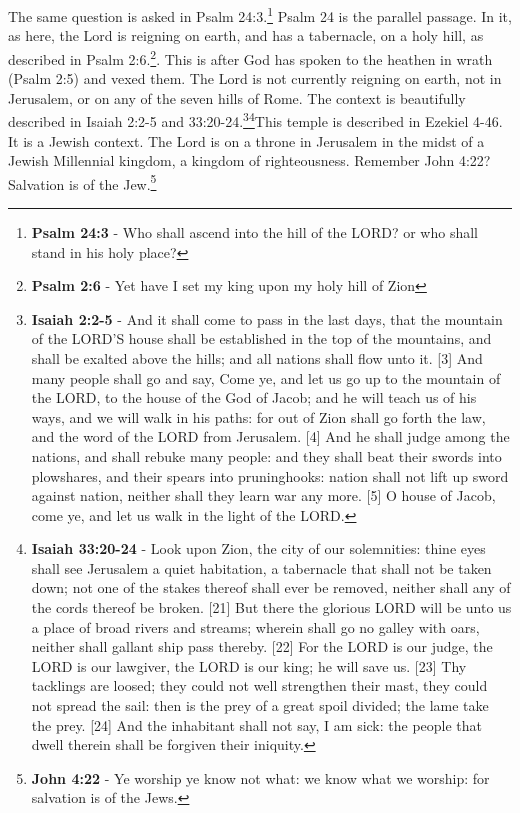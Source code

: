 \noindent The same question is asked in Psalm 24:3.\footnote{\textbf{Psalm 24:3} - Who shall ascend into the hill of the LORD? or who shall stand in his holy place?} Psalm 24 is the parallel passage. In it, as here, the Lord is reigning on earth, and has a tabernacle, on a holy hill, as described in Psalm 2:6.\footnote{\textbf{Psalm 2:6} - Yet have I set my king upon my holy hill of Zion}. This is after God has spoken to the heathen in wrath (Psalm 2:5) and vexed them. The Lord is not currently reigning on earth, not in Jerusalem, or on any of the seven hills of Rome. The context is beautifully described in Isaiah 2:2-5 and 33:20-24.\footnote{\textbf{Isaiah 2:2-5} - And it shall come to pass in the last days, that the mountain of the LORD’S house shall be established in the top of the mountains, and shall be exalted above the hills; and all nations shall flow unto it. [3] And many people shall go and say, Come ye, and let us go up to the mountain of the LORD, to the house of the God of Jacob; and he will teach us of his ways, and we will walk in his paths: for out of Zion shall go forth the law, and the word of the LORD from Jerusalem. [4] And he shall judge among the nations, and shall rebuke many people: and they shall beat their swords into plowshares, and their spears into pruninghooks: nation shall not lift up sword against nation, neither shall they learn war any more. [5] O house of Jacob, come ye, and let us walk in the light of the LORD.}\footnote{\textbf{Isaiah 33:20-24} - Look upon Zion, the city of our solemnities: thine eyes shall see Jerusalem a quiet habitation, a tabernacle that shall not be taken down; not one of the stakes thereof shall ever be removed, neither shall any of the cords thereof be broken. [21] But there the glorious LORD will be unto us a place of broad rivers and streams; wherein shall go no galley with oars, neither shall gallant ship pass thereby. [22] For the LORD is our judge, the LORD is our lawgiver, the LORD is our king; he will save us. [23] Thy tacklings are loosed; they could not well strengthen their mast, they could not spread the sail: then is the prey of a great spoil divided; the lame take the prey. [24] And the inhabitant shall not say, I am sick: the people that dwell therein shall be forgiven their iniquity.}This temple is described in Ezekiel 4-46. It is a Jewish context. The Lord is on a throne in Jerusalem in the midst of a Jewish Millennial kingdom, a kingdom of righteousness. Remember John 4:22? Salvation is of the Jew.\footnote{\textbf{John 4:22} - \textcolor[cmyk]{0,1,0,0}{Ye worship ye know not what: we know what we worship: for salvation is of the Jews.}}\\
